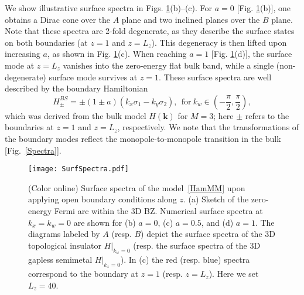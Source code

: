 \documentclass[twocolumn,prl,10pt,superscriptaddress]{revtex4}
\begin{document}
We show illustrative surface spectra in Figs. \ref{FerArc}(b)--(c). For $a\!=\!0$ [Fig. \ref{FerArc}(b)], one obtains a Dirac cone over the $A$ plane and two inclined planes over the $B$ plane. Note that these spectra are 2-fold degenerate, as they describe the surface states on both boundaries (at $z\!=\!1$ and $z\!=\!L_z\!$). This degeneracy is then lifted upon increasing $a$, as shown in Fig. \ref{FerArc}(c). When reaching $a\!=\!1$ [Fig. \ref{FerArc}(d)], the surface mode at $z\!=\!L_z$ vanishes into the zero-energy flat bulk band, while a single (non-degenerate) surface mode survives at $z\!=\!1$. These surface spectra are well described by the boundary Hamiltonian~\cite{SM}
 \begin{equation}
 H^{BS}_{\pm}=\pm(1\pm a)(k_x\sigma_1-k_y\sigma_2), ~~\text{for}~k_w\in\left(-\frac{\pi}{2}, \frac{\pi}{2}\right),
 \end{equation}
which was derived from the bulk model $H({\boldsymbol k})$ for $M\!=\!3$; here $\pm$ refers to the boundaries at $z\!=\!1$ and $z\!=\!L_z$, respectively. We note that the transformations of the boundary modes reflect the monopole-to-monopole transition in the bulk [Fig.~\ref{Spectra}].



\begin{figure}[htbp]\centering
\texttt{[image: SurfSpectra.pdf]}
 \caption{(Color online)  Surface spectra of the model~\eqref{HamMM} upon applying open boundary conditions along $z$. (a) Sketch of the zero-energy Fermi arc within the 3D BZ. Numerical surface spectra at $k_x=k_w=0$ are shown for (b) $a=0$, (c) $a=0.5$, and (d) $a=1$. The diagrams labeled by $A$ (resp. $B$) depict the surface spectra of the 3D topological insulator $H|_{k_w=0}$ (resp. the surface spectra of the 3D gapless semimetal $H|_{k_x=0}$). In (c) the red (resp. blue) spectra correspond to the boundary at $z=1$ (resp. $z=L_z$). Here we set $L_z\!=\!40$.} \label{FerArc}
\end{figure}
\end{document}
